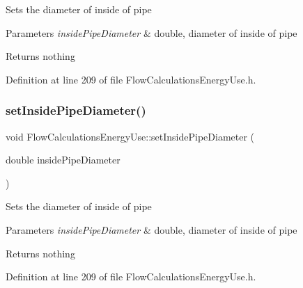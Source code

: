 Sets the diameter of inside of pipe


\begin{DoxyParams}{Parameters}
{\em inside\+Pipe\+Diameter} & double, diameter of inside of pipe\\
\hline
\end{DoxyParams}
\begin{DoxyReturn}{Returns}
nothing 
\end{DoxyReturn}


Definition at line 209 of file Flow\+Calculations\+Energy\+Use.\+h.

\mbox{\label{class_flow_calculations_energy_use_a616486580460b616a7a8c4935119cd6c}} 
\subsubsection{\texorpdfstring{set\+Inside\+Pipe\+Diameter()}{setInsidePipeDiameter()}\hspace{0.1cm}{\footnotesize\ttfamily [2/3]}}
{\footnotesize\ttfamily void Flow\+Calculations\+Energy\+Use\+::set\+Inside\+Pipe\+Diameter (\begin{DoxyParamCaption}\item[{double}]{inside\+Pipe\+Diameter }\end{DoxyParamCaption})\hspace{0.3cm}{\ttfamily [inline]}}

Sets the diameter of inside of pipe


\begin{DoxyParams}{Parameters}
{\em inside\+Pipe\+Diameter} & double, diameter of inside of pipe\\
\hline
\end{DoxyParams}
\begin{DoxyReturn}{Returns}
nothing 
\end{DoxyReturn}


Definition at line 209 of file Flow\+Calculations\+Energy\+Use.\+h.

\mbox{\label{class_flow_calculations_energy_use_a616486580460b616a7a8c4935119cd6c}} 
